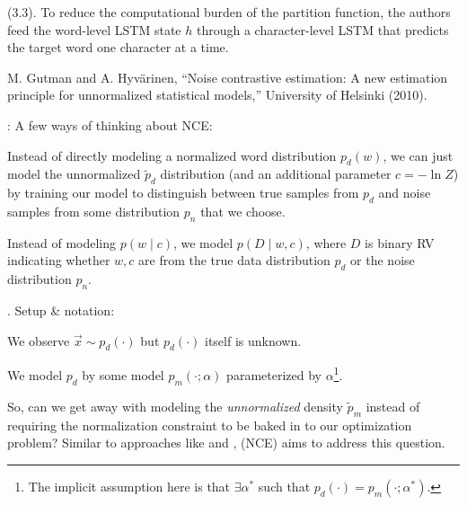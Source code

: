 \documentclass[11pt]{article}
\begin{document}
\myspace
\p {} (3.3). To reduce the computational burden of the partition function, the authors feed the word-level LSTM state $h$ through a character-level LSTM that predicts the target word one character at a time.





\vspace{-1em}
{\footnotesize M. Gutman and A. Hyv\"{a}rinen, ``Noise contrastive estimation: A new estimation principle for unnormalized statistical models,'' University of Helsinki  (2010).}

\p {}: A few ways of thinking about NCE:
\begin{compactitem}
	\item Instead of directly modeling a normalized word distribution $p_d(w)$, we can just model the unnormalized $\widetilde{p}_d$ distribution (and an additional parameter $c = - \ln Z$) by training our model to distinguish between true samples from $p_d$ and noise samples from some distribution $p_n$ that we choose.
	
	\item Instead of modeling $p(w \mid c)$, we model $p(D \mid w, c)$, where $D$ is binary RV indicating whether $w, c$ are from the true data distribution $p_d$ or the noise distribution $p_n$. 
\end{compactitem}

\myspace
\p {}. Setup \& notation:
\begin{compactitem}
	\item We observe $\vec x \sim p_d(\cdot)$ but $p_d(\cdot)$ itself is unknown. 
	\item We model $p_d$ by some model $p_m(\cdot ; \alpha)$ parameterized by $\alpha$\footnote{The implicit assumption here is that $\exists \alpha^*$ such that $p_d(\cdot) = p_m(\cdot; \alpha^*)$.}.  
\end{compactitem}
So, can we get away with modeling the \textit{unnormalized} density $\widetilde{p}_m$ instead of requiring the normalization constraint to be baked in to our  optimization problem? Similar to approaches like  and ,  (NCE) aims to address this question.
\end{document}
